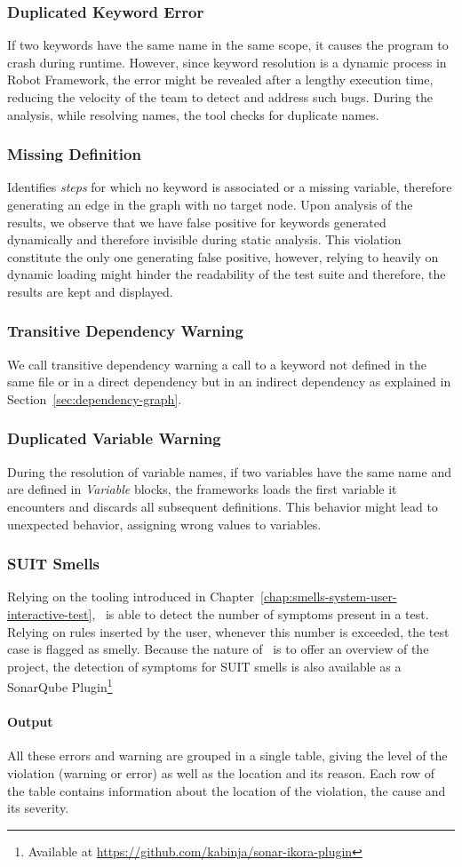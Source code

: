 \subsubsection{Duplicated Keyword Error} If two keywords have the same name in the same scope, it causes the program to crash during runtime. However, since keyword resolution is a dynamic process in Robot Framework, the error might be revealed after a lengthy execution time, reducing the velocity of the team to detect and address such bugs. During the analysis, while resolving names, the tool checks for duplicate names.

\subsubsection{Missing Definition} Identifies \emph{steps} for which no keyword is associated or a missing variable, therefore generating an edge in the graph with no target node. Upon analysis of the results, we observe that we have false positive for keywords generated dynamically and therefore invisible during static analysis. This violation constitute the only one generating false positive, however, relying to heavily on dynamic loading might hinder the readability of the test suite and therefore, the results are kept and displayed.

\subsubsection{Transitive Dependency Warning} We call transitive dependency warning a call to a keyword not defined in the same file or in a direct dependency but in an indirect dependency as explained in Section~\ref{sec:dependency-graph}.

\subsubsection{Duplicated Variable Warning} During the resolution of variable names, if two variables have the same name and are defined in \emph{Variable} blocks, the frameworks loads the first variable it encounters and discards all subsequent definitions. This behavior might lead to unexpected behavior, assigning wrong values to variables.

\subsubsection{SUIT Smells} Relying on the tooling introduced in Chapter~\ref{chap:smells-system-user-interactive-test}, \tool\ is able to detect the number of symptoms present in a test. Relying on rules inserted by the user, whenever this number is exceeded, the test case is flagged as smelly. Because the nature of \tool\ is to offer an overview of the project, the detection of symptoms for SUIT smells is also available as a SonarQube Plugin\footnote{Available at \url{https://github.com/kabinja/sonar-ikora-plugin}}

\paragraph{Output} All these errors and warning are grouped in a single table, giving the level of the violation (warning or error) as well as the location and its reason. Each row of the table contains information about the location of the violation, the cause and its severity.
